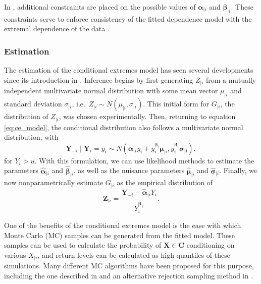\documentclass{article}
\numberwithin{equation}{section}
\begin{document}
In \citet{Keef2013}, additional constraints are placed on the possible values of $\bm{\alpha}_{\mid i}$ and $\bm{\beta}_{\mid i}$.
These constraints serve to enforce consistency of the fitted dependence model with the extremal dependence of the data \citep{Southworth2024_vignette}.

\subsubsection{Estimation} \label{subsubsec:estimation}

The estimation of the conditional extremes model has seen several developments since its introduction in \cite{Heffernan2004}.
Inference begins by first generating $Z_{\mid i}$ from a mutually independent multivariate normal distribution with some mean vector $\mu_{\mid i}$ and standard deviation $\sigma_{\mid i}$, i.e.\ $Z_{\mid i} \sim N(\mu_{\mid i}, \sigma_{\mid i})$. 
This initial form for $G_{\mid i}$, the distribution of $Z_{\mid i}$, was chosen experimentally. 
Then, returning to equation \eqref{eq:ce_model}, the conditional distribution also follows a multivariate normal distribution, with
\[
  \bm{Y}_{-i} \mid \bm{Y}_i = y_i \sim N\left(\bm{\alpha}_{\mid i} y_i + y_i^{\bm{\beta}_i} \bm{\mu}_{\mid i}, y_i^{\bm{\beta}_i} \bm{\sigma_{\mid i}}\right),
\]
for $Y_i > u$. 
With this formulation, we can use likelihood methods to estimate the parameters $\hat{\bm{\alpha}}_{\mid i}$ and $\hat{\bm{\beta}}_{\mid i}$, as well as the nuisance parameters $\hat{\bm{\mu}}_{\mid i}$ and $\hat{\bm{\sigma}}_{\mid i}$.
Finally, we now nonparametrically estimate $G_{\mid i}$ as the empirical distribution of 
\[
  \bm{Z}_{\mid i} = \frac{\bm{Y}_{-i} - \hat{\bm{\alpha}}_{\mid i}Y_i}{Y_i^{\hat{\bm{\beta}}_{\mid i}}}.
\]

One of the benefits of the conditional extremes model is the ease with which Monte Carlo (MC) samples can be generated from the fitted model.
These samples can be used to calculate the probability of $\bm{X} \in \bm{C}$ conditioning on various $X_{\mid i}$, and return levels can be calculated as high quantiles of these simulations.
Many different MC algorithms have been proposed for this purpose, including the one described in \cite{Heffernan2004} and an alternative rejection sampling method in \cite{Keef2012_flooding}.
\end{document}
